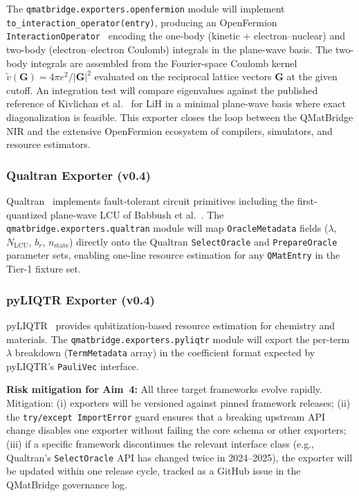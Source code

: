 \documentclass[11pt]{article}
\begin{document}
The \texttt{qmatbridge.exporters.openfermion} module will implement
\texttt{to\_interaction\_operator(entry)}, producing an OpenFermion
\texttt{InteractionOperator}~\cite{McClean2020} encoding the one-body
(kinetic $+$ electron--nuclear) and two-body (electron--electron Coulomb)
integrals in the plane-wave basis.
The two-body integrals are assembled from the Fourier-space Coulomb
kernel $\tilde{v}(\mathbf{G}) = 4\pi e^2 / |\mathbf{G}|^2$ evaluated
on the reciprocal lattice vectors $\mathbf{G}$ at the given cutoff.
An integration test will compare eigenvalues against the published
reference of Kivlichan et al.~\cite{Kivlichan2018} for LiH
in a minimal plane-wave basis where exact diagonalization is feasible.
This exporter closes the loop between the QMatBridge NIR and the
extensive OpenFermion ecosystem of compilers, simulators, and
resource estimators.

\subsubsection{Qualtran Exporter (v0.4)}

Qualtran~\cite{Qualtran2023} implements fault-tolerant circuit primitives
including the first-quantized plane-wave LCU of Babbush et al.~\cite{Babbush2019}.
The \texttt{qmatbridge.exporters.qualtran} module will map
\texttt{OracleMetadata} fields ($\lambda$, $N_{\mathrm{LCU}}$, $b_r$,
$n_{\mathrm{state}}$) directly onto the Qualtran \texttt{SelectOracle}
and \texttt{PrepareOracle} parameter sets, enabling one-line resource
estimation for any \texttt{QMatEntry} in the Tier-1 fixture set.

\subsubsection{pyLIQTR Exporter (v0.4)}

pyLIQTR~\cite{pyLIQTR2023} provides qubitization-based resource estimation
for chemistry and materials.
The \texttt{qmatbridge.exporters.pyliqtr} module will export the
per-term $\lambda$ breakdown (\texttt{TermMetadata} array) in the
coefficient format expected by pyLIQTR's \texttt{PauliVec} interface.

\textbf{Risk mitigation for Aim~4:} All three target frameworks evolve
rapidly.
Mitigation: (i) exporters will be versioned against pinned framework
releases; (ii) the \texttt{try/except ImportError} guard ensures that a
breaking upstream API change disables one exporter without failing the
core schema or other exporters; (iii) if a specific framework discontinues
the relevant interface class (e.g., Qualtran's \texttt{SelectOracle} API
has changed twice in 2024--2025), the exporter will be updated within
one release cycle, tracked as a GitHub issue in the QMatBridge governance
log.
\end{document}
